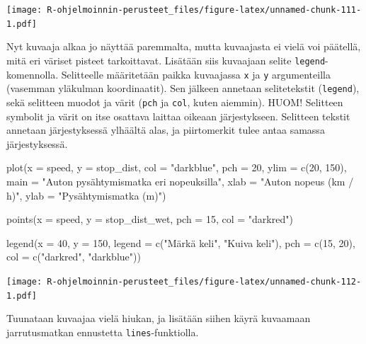 \documentclass[
]{book}
\newenvironment{Shaded}{\begin{snugshade}}{\end{snugshade}}
\newcommand{\AttributeTok}[1]{\textcolor[rgb]{0.77,0.63,0.00}{#1}}
\newcommand{\DecValTok}[1]{\textcolor[rgb]{0.00,0.00,0.81}{#1}}
\newcommand{\FunctionTok}[1]{\textcolor[rgb]{0.00,0.00,0.00}{#1}}
\newcommand{\NormalTok}[1]{#1}
\newcommand{\StringTok}[1]{\textcolor[rgb]{0.31,0.60,0.02}{#1}}
\begin{document}
\texttt{[image: R-ohjelmoinnin-perusteet\_files/figure-latex/unnamed-chunk-111-1.pdf]}

Nyt kuvaaja alkaa jo näyttää paremmalta, mutta kuvaajasta ei vielä voi päätellä, mitä eri väriset pisteet tarkoittavat. Lisätään siis kuvaajaan selite \texttt{legend}-komennolla. Selitteelle määritetään paikka kuvaajassa \texttt{x} ja \texttt{y} argumenteilla (vasemman yläkulman koordinaatit). Sen jälkeen annetaan selitetekstit (\texttt{legend}), sekä selitteen muodot ja värit (\texttt{pch} ja \texttt{col}, kuten aiemmin). HUOM! Selitteen symbolit ja värit on itse osattava laittaa oikeaan järjestykseen. Selitteen tekstit annetaan järjestyksessä ylhäältä alas, ja piirtomerkit tulee antaa samassa järjestyksessä.

\begin{Shaded}
\begin{Highlighting}[]
\FunctionTok{plot}\NormalTok{(}\AttributeTok{x =}\NormalTok{ speed, }\AttributeTok{y =}\NormalTok{ stop\_dist,}
     \AttributeTok{col =} \StringTok{"darkblue"}\NormalTok{, }\AttributeTok{pch =} \DecValTok{20}\NormalTok{,}
     \AttributeTok{ylim =} \FunctionTok{c}\NormalTok{(}\DecValTok{20}\NormalTok{, }\DecValTok{150}\NormalTok{),}
     \AttributeTok{main =} \StringTok{"Auton pysähtymismatka eri nopeuksilla"}\NormalTok{,}
     \AttributeTok{xlab =} \StringTok{"Auton nopeus (km / h)"}\NormalTok{, }\AttributeTok{ylab =} \StringTok{"Pysähtymismatka (m)"}\NormalTok{)}

\FunctionTok{points}\NormalTok{(}\AttributeTok{x =}\NormalTok{ speed, }\AttributeTok{y =}\NormalTok{ stop\_dist\_wet, }\AttributeTok{pch =} \DecValTok{15}\NormalTok{, }\AttributeTok{col =} \StringTok{"darkred"}\NormalTok{)}

\FunctionTok{legend}\NormalTok{(}\AttributeTok{x =} \DecValTok{40}\NormalTok{, }\AttributeTok{y =} \DecValTok{150}\NormalTok{,}
       \AttributeTok{legend =} \FunctionTok{c}\NormalTok{(}\StringTok{"Märkä keli"}\NormalTok{, }\StringTok{"Kuiva keli"}\NormalTok{),}
       \AttributeTok{pch =} \FunctionTok{c}\NormalTok{(}\DecValTok{15}\NormalTok{, }\DecValTok{20}\NormalTok{), }\AttributeTok{col =} \FunctionTok{c}\NormalTok{(}\StringTok{"darkred"}\NormalTok{, }\StringTok{"darkblue"}\NormalTok{))}
\end{Highlighting}
\end{Shaded}

\texttt{[image: R-ohjelmoinnin-perusteet\_files/figure-latex/unnamed-chunk-112-1.pdf]}

Tuunataan kuvaajaa vielä hiukan, ja lisätään siihen käyrä kuvaamaan jarrutusmatkan ennustetta \texttt{lines}-funktiolla.
\end{document}
